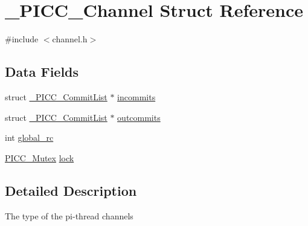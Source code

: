 \hypertarget{struct__PICC__Channel}{\section{\-\_\-\-P\-I\-C\-C\-\_\-\-Channel Struct Reference}
\label{struct__PICC__Channel}
}


{\ttfamily \#include $<$channel.\-h$>$}

\subsection*{Data Fields}
{\bf }\par
\begin{DoxyCompactItemize}
\item 
struct \hyperlink{struct__PICC__CommitList}{\-\_\-\-P\-I\-C\-C\-\_\-\-Commit\-List} $\ast$ \hyperlink{struct__PICC__Channel_ad6f44f3feb22c8bb8390cd6663209db8}{incommits}
\item 
struct \hyperlink{struct__PICC__CommitList}{\-\_\-\-P\-I\-C\-C\-\_\-\-Commit\-List} $\ast$ \hyperlink{struct__PICC__Channel_a1015ce4e3d56e74b0b5cf157df50c319}{outcommits}
\item 
int \hyperlink{struct__PICC__Channel_a2a19db7029a1bf3b7d28e74bac691b09}{global\-\_\-rc}
\item 
\hyperlink{sync_8h_a600a20a1dd394c06182a81d72e3357f4}{P\-I\-C\-C\-\_\-\-Mutex} \hyperlink{struct__PICC__Channel_a3d02581ff833cb6224c88d4657fb2c50}{lock}
\end{DoxyCompactItemize}



\subsection{Detailed Description}
The type of the pi-\/thread channels 

